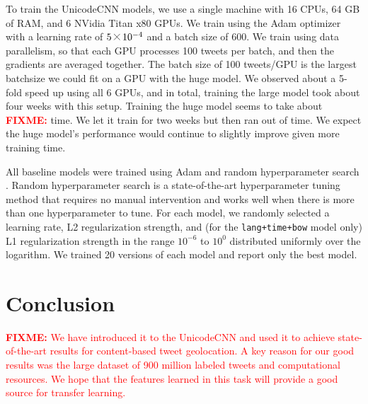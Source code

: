 \documentclass[sigconf,anonymous,review,10pt]{acmart}
\renewcommand{\times}{\mathbin{\tikz [x=1.4ex,y=1.4ex,line width=.1ex] \draw (0,0) -- (1,1) (0,1) -- (1,0);}}%
\newcommand{\str}[1]{\texttt{#1}}
\newcommand{\fixme}[1]{\textcolor{red}{\textbf{FIXME:} {#1}}}
\begin{document}
\begin{description}
To train the UnicodeCNN models,
we use a single machine with 16 CPUs, 64 GB of RAM, and 6 NVidia Titan x80 GPUs. 
We train using the Adam optimizer \citep{kingma2014adam} with a learning rate of $5\times10^{-4}$ and a batch size of 600.
We train using data parallelism, so that each GPU processes 100 tweets per batch, 
and then the gradients are averaged together.
The batch size of 100 tweets/GPU is the largest batchsize we could fit on a GPU with the huge model.
We observed about a 5-fold speed up using all 6 GPUs,
and in total, training the large model took about four weeks with this setup.
Training the huge model seems to take about \fixme{} time.
We let it train for two weeks but then ran out of time.
We expect the huge model's performance would continue to slightly improve given more training time.

All baseline models were trained using Adam \citep{kingma2014adam} and random hyperparameter search \citep{bergstra2012random}.
Random hyperparameter search is a state-of-the-art hyperparameter tuning method that requires no manual intervention and works well when there is more than one hyperparameter to tune.
For each model, we randomly selected a learning rate, L2 regularization strength, and (for the \str{lang+time+bow} model only) L1 regularization strength in the range $10^{-6}$ to $10^0$ distributed uniformly over the logarithm.
We trained 20 versions of each model and report only the best model.

\end{description}


\section{Conclusion}

\fixme{
We have introduced it to the UnicodeCNN and used it to achieve state-of-the-art results for content-based tweet geolocation.
A key reason for our good results was the large dataset of 900 million labeled tweets and computational resources.
We hope that the features learned in this task will provide a good source for transfer learning.
}
\end{document}
